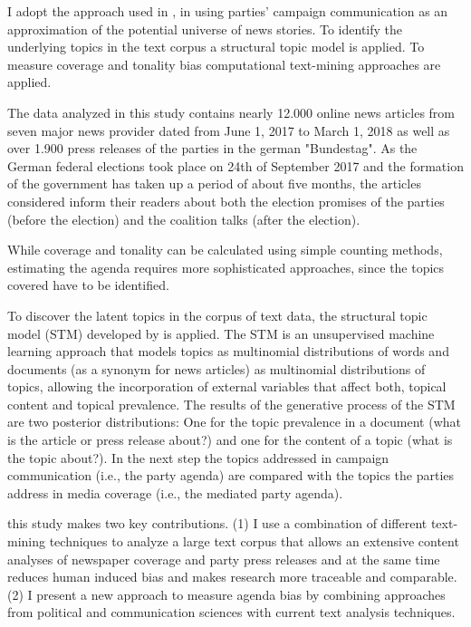 \documentclass[12pt,a4paper,notitlepage]{article}
\begin{document}
I adopt the approach used in \citet{eberl_one_2017}, in using parties' campaign communication as an approximation of the potential universe of news stories. To identify the underlying topics in the text corpus a structural topic model is applied. To measure coverage and tonality bias computational text-mining approaches are applied. 

The data analyzed in this study contains nearly 12.000 online news articles from seven major news provider dated from June 1, 2017 to March 1, 2018 as well as over 1.900 press releases of the parties in the german "Bundestag". As the German federal elections took place on 24th of September 2017 and the formation of the government has taken up a period of about five months, the articles considered inform their readers about both the election promises of the parties (before the election) and the coalition talks (after the election). 

While coverage and tonality can be calculated using simple counting methods, estimating the agenda requires more sophisticated approaches, since the topics covered have to be identified.

To discover the latent topics in the corpus of text data, the structural topic model (STM) developed by \citet{roberts_model_2016} is applied. The STM is an unsupervised machine learning approach that models topics as multinomial distributions of words and documents (as a synonym for news articles) as multinomial distributions of topics, allowing the incorporation of external variables that affect both, topical content and topical prevalence. The results of the generative process of the STM are two posterior distributions: One for the topic prevalence in a document (what is the article or press release about?) and one for the content of a topic (what is the topic about?). In the next step the topics addressed in campaign communication (i.e., the party agenda) are compared with the topics the parties address in media coverage (i.e., the mediated party agenda).


this study makes two key contributions. (1) I use a combination of different text-mining techniques to analyze a large text corpus that allows an extensive content analyses of newspaper coverage and party press releases and at the same time reduces human induced bias and makes research more traceable and comparable. (2) I present a new approach to measure agenda bias by combining approaches from political and communication sciences with current text analysis techniques.    
\end{document}
